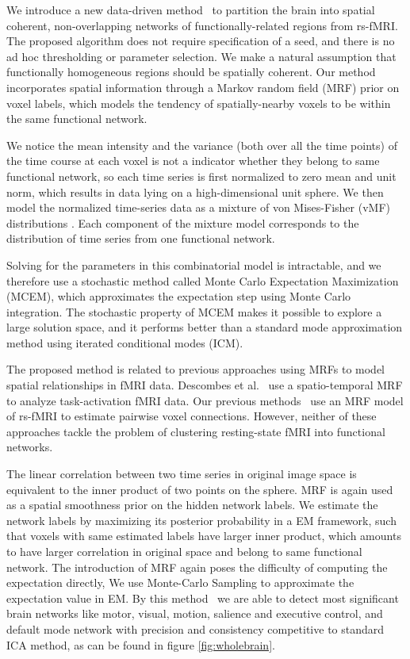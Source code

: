 \documentclass[12pt]{article}
\begin{document}
We introduce a new data-driven method~\cite{liu2011monte} to partition the brain
into spatial coherent, non-overlapping networks of functionally-related regions
from rs-fMRI. The proposed algorithm does not require specification of a seed,
and there is no ad hoc thresholding or parameter selection. We make a natural
assumption that functionally homogeneous regions should be spatially
coherent. Our method incorporates spatial information through a Markov random
field (MRF) prior on voxel labels, which models the tendency of spatially-nearby
voxels to be within the same functional network.

We notice the mean intensity and the variance (both over all the time points) of
the time course at each voxel is not a indicator whether they belong to same
functional network, so each time series is first normalized to zero mean and unit
norm, which results in data lying on a high-dimensional unit sphere. We then
model the normalized time-series data as a mixture of von Mises-Fisher (vMF)
distributions \cite{banerjee2006clustering}. Each component of the mixture model
corresponds to the distribution of time series from one functional network.

Solving for the parameters in this combinatorial model is intractable, and we
therefore use a stochastic method called Monte Carlo Expectation Maximization
(MCEM), which approximates the expectation step using Monte Carlo
integration. The stochastic property of MCEM makes it possible to explore a
large solution space, and it performs better than a standard mode approximation
method using iterated conditional modes (ICM).

The proposed method is related to previous approaches using MRFs to model
spatial relationships in fMRI data. Descombes et
al.~\cite{descombes_spatio-temporal_1998} use a spatio-temporal MRF to analyze
task-activation fMRI data. Our previous methods~\cite{liu2010spatial} use an MRF
model of rs-fMRI to estimate pairwise voxel connections. However, neither of
these approaches tackle the problem of clustering resting-state fMRI into
functional networks.

The linear correlation between two time series in original image space is
equivalent to the inner product of two points on the sphere.  MRF is again used
as a spatial smoothness prior on the hidden network labels. We estimate the
network labels by maximizing its posterior probability in a EM framework, such
that voxels with same estimated labels have larger inner product, which amounts
to have larger correlation in original space and belong to same functional
network. The introduction of MRF again poses the difficulty of computing the
expectation directly, We use Monte-Carlo Sampling to approximate the expectation
value in EM. By this method~\cite{liu2011monte} we are able to detect most
significant brain networks like motor, visual, motion, salience and executive
control, and default mode network with precision and consistency competitive to
standard ICA method, as can be found in figure \ref{fig:wholebrain}.
\end{document}

